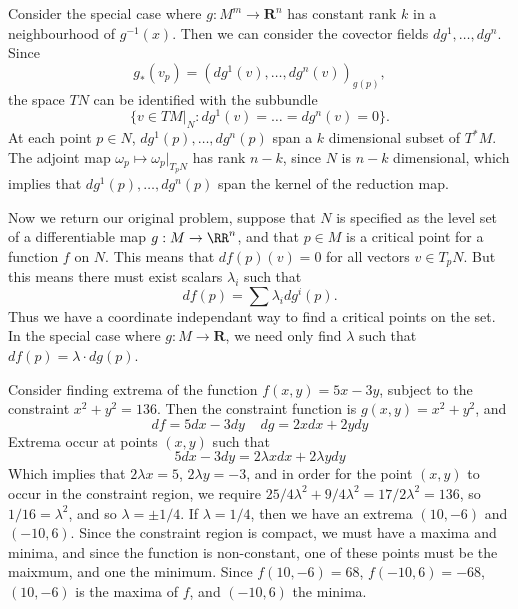 Consider the special case where $g: M^m \to \mathbf{R}^n$ has constant rank $k$ in a neighbourhood of $g^{-1}(x)$. Then we can consider the covector fields $dg^1,\dots,dg^n$. Since
%
\[ g_*(v_p) = (dg^1(v), \dots, dg^n(v))_{g(p)}, \]
%
the space $TN$ can be identified with the subbundle
%
\[ \{ v \in TM|_N : dg^1(v) = \dots = dg^n(v) = 0 \}. \]
%
At each point $p \in N$, $dg^1(p), \dots, dg^n(p)$ span a $k$ dimensional subset of $T^*M$. The adjoint map $\omega_p \mapsto \omega_p|_{T_pN}$ has rank $n-k$, since $N$ is $n-k$ dimensional, which implies that $dg^1(p), \dots, dg^n(p)$ span the kernel of the reduction map.

Now we return our original problem, suppose that $N$ is specified as the level set of a differentiable map $g: M \to \RR^n$, and that $p \in M$ is a critical point for a function $f$ on $N$. This means that $df(p)(v) = 0$ for all vectors $v \in T_pN$. But this means there must exist scalars $\lambda_i$ such that
%
\[ df(p) = \sum \lambda_i dg^i(p). \]
%
Thus we have a coordinate independant way to find a critical points on the set. In the special case where $g: M \to \mathbf{R}$, we need only find $\lambda$ such that $df(p) = \lambda \cdot dg(p)$.

\begin{example}
    Consider finding extrema of the function $f(x,y) = 5x - 3y$, subject to the constraint $x^2 + y^2 = 136$. Then the constraint function is $g(x,y) = x^2 + y^2$, and
    \[ df = 5dx - 3dy\ \ \ \ \ dg = 2x dx + 2y dy \]
    Extrema occur at points $(x,y)$ such that
    \[ 5dx - 3dy = 2 \lambda x dx + 2 \lambda y dy \]
    Which implies that $2 \lambda x = 5$, $2 \lambda y = -3$, and in order for the point $(x,y)$ to occur in the constraint region, we require $25/4 \lambda^2 + 9/4 \lambda^2 = 17/2\lambda^2 = 136$, so $1/16 = \lambda^2$, and so $\lambda = \pm 1/4$. If $\lambda = 1/4$, then we have an extrema $(10, -6)$ and $(-10, 6)$. Since the constraint region is compact, we must have a maxima and minima, and since the function is non-constant, one of these points must be the maixmum, and one the minimum. Since $f(10,-6) = 68$, $f(-10,6) = -68$, $(10,-6)$ is the maxima of $f$, and $(-10,6)$ the minima.
\end{example}

